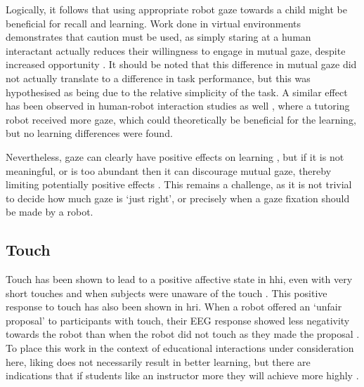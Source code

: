 Logically, it follows that using appropriate robot gaze towards a child might be beneficial for recall and learning. Work done in virtual environments demonstrates that caution must be used, as simply staring at a human interactant actually reduces their willingness to engage in mutual gaze, despite increased opportunity \citep{dalzel2011don}. It should be noted that this difference in mutual gaze did not actually translate to a difference in task performance, but this was hypothesised as being due to the relative simplicity of the task. A similar effect has been observed in human-robot interaction studies as well \citep{kennedy2015comparing, looije2012help}, where a tutoring robot received more gaze, which could theoretically be beneficial for the learning, but no learning differences were found.

Nevertheless, gaze can clearly have positive effects on learning \citep{otteson1979effect, sherwood1987facilitative, okumura2013power, yu2007unified}, but if it is not meaningful, or is too abundant then it can discourage mutual gaze, thereby limiting potentially positive effects \citep{dalzel2011don}. This remains a challenge, as it is not trivial to decide how much gaze is `just right', or precisely when a gaze fixation should be made by a robot.


\subsection{Touch} \label{sec:background-touch}
Touch has been shown to lead to a positive affective state in \acrshort{hhi}, even with very short touches and when subjects were unaware of the touch \citep{fisher1976hands}. This positive response to touch has also been shown in \acrshort{hri}. When a robot offered an `unfair proposal' to participants with touch, their EEG response showed less negativity towards the robot than when the robot did not touch as they made the proposal \citep{fukuda2012midas}. To place this work in the context of educational interactions under consideration here, liking does not necessarily result in better learning, but there are indications that if students like an instructor more they will achieve more highly \citep{gurung2007looking}.

